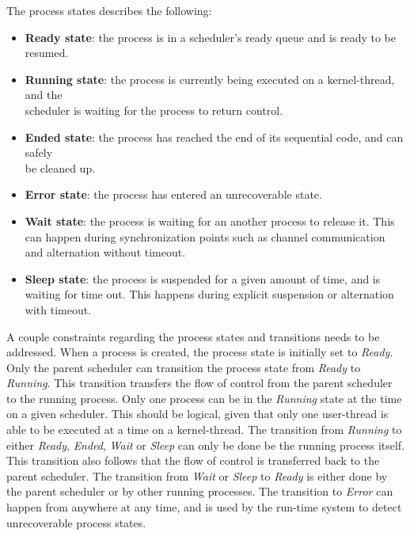 \FloatBarrier

The process states describes the following: 
\begin{itemize}[topsep=0em,itemsep=-1em,partopsep=-1em,parsep=1em]
    \item \textbf{Ready state}: the process is in a scheduler's ready queue and is ready to be resumed. 
    \item \textbf{Running state}: the process is currently being executed on a kernel\hyp{}thread, and the\\ scheduler is waiting for the process to return control.
    \item \textbf{Ended state}: the process has reached the end of its sequential code, and can safely\\ be cleaned up.
    \item \textbf{Error state}: the process has entered an unrecoverable state.
    \item \textbf{Wait state}: the process is waiting for an another process to release it. This can happen during synchronization points such as channel communication and alternation without timeout.
    \item \textbf{Sleep state}: the process is suspended for a given amount of time, and is waiting for time out. This happens during explicit suspension or alternation with timeout.  
\end{itemize}

A couple constraints regarding the process states and transitions needs to be addressed. When a process is created, the process state is initially set to \textit{Ready}. Only the parent scheduler can transition the process state from \textit{Ready} to \textit{Running}. This transition transfers the flow of control from the parent scheduler to the running process. Only one process can be in the \textit{Running} state at the time on a given scheduler. This should be logical, given that only one user\hyp{}thread is able to be executed at a time on a kernel\hyp{}thread. The transition from \textit{Running} to either \textit{Ready}, \textit{Ended}, \textit{Wait} or \textit{Sleep} can only be done be the running process itself. This transition also follows that the flow of control is transferred back to the parent scheduler. The transition from \textit{Wait} or \textit{Sleep} to \textit{Ready} is either done by the parent scheduler or by other running processes. The transition to \textit{Error} can happen from anywhere at any time, and is used by the run\hyp{}time system to detect unrecoverable process states.


